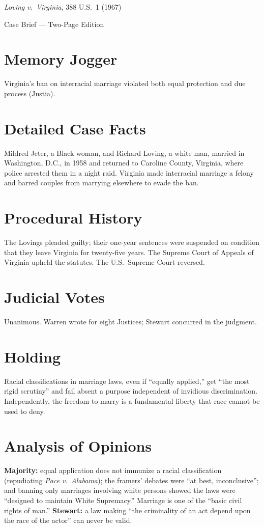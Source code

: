 \documentclass[12pt]{article}
\begin{document}
\begin{center}
{\LARGE \textit{Loving v.\ Virginia}, 388 U.S.\ 1 (1967)\par}
\vspace{0.5em}
{\large Case Brief --- Two-Page Edition\par}
\end{center}

\section{Memory Jogger}
Virginia's ban on interracial marriage violated both equal protection and due process (\href{https://supreme.justia.com/cases/federal/us/388/1/}{Justia}).

\section{Detailed Case Facts}
Mildred Jeter, a Black woman, and Richard Loving, a white man, married in Washington, D.C., in 1958 and returned to Caroline County, Virginia, where police arrested them in a night raid. Virginia made interracial marriage a felony and barred couples from marrying elsewhere to evade the ban.

\section{Procedural History}
The Lovings pleaded guilty; their one-year sentences were suspended on condition that they leave Virginia for twenty-five years. The Supreme Court of Appeals of Virginia upheld the statutes. The U.S.\ Supreme Court reversed.

\section{Judicial Votes}
Unanimous. Warren wrote for eight Justices; Stewart concurred in the judgment.

\section{Holding}
Racial classifications in marriage laws, even if ``equally applied,'' get ``the most rigid scrutiny'' and fail absent a purpose independent of invidious discrimination. Independently, the freedom to marry is a fundamental liberty that race cannot be used to deny.

\section{Analysis of Opinions}
\textbf{Majority:} equal application does not immunize a racial classification (repudiating \textit{Pace v.\ Alabama}); the framers' debates were ``at best, inconclusive''; and banning only marriages involving white persons showed the laws were ``designed to maintain White Supremacy.'' Marriage is one of the ``basic civil rights of man.'' \textbf{Stewart:} a law making ``the criminality of an act depend upon the race of the actor'' can never be valid.
\end{document}

